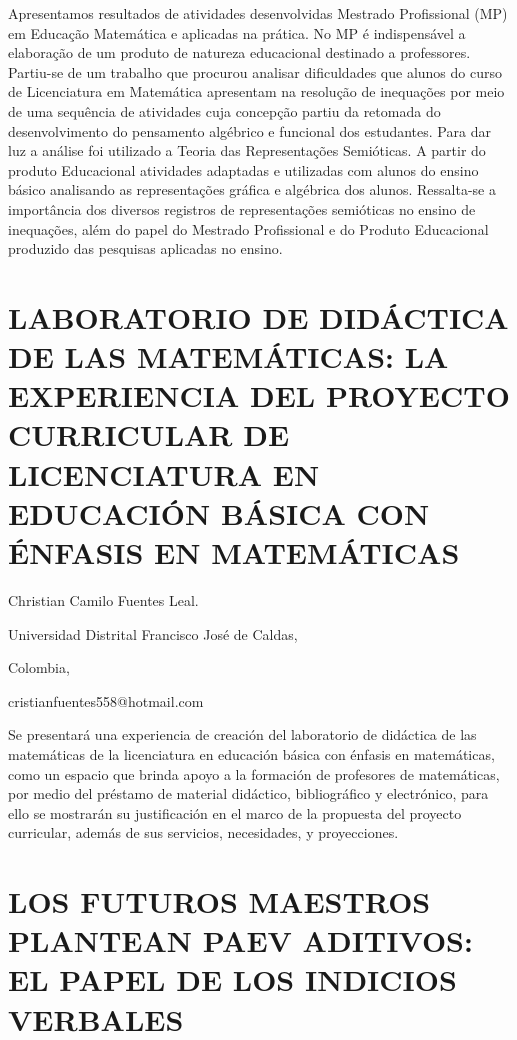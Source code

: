 Apresentamos resultados de atividades desenvolvidas Mestrado Profissional
(MP) em Educação Matemática e aplicadas na prática. No MP é indispensável
a elaboração de um produto de natureza educacional destinado a professores.
Partiu-se de um trabalho que procurou analisar dificuldades que alunos
do curso de Licenciatura em Matemática apresentam na resolução de
inequações por meio de uma sequência de atividades cuja concepção
partiu da retomada do desenvolvimento do pensamento algébrico e funcional
dos estudantes. Para dar luz a análise foi utilizado a Teoria das
Representações Semióticas. A partir do produto Educacional atividades
adaptadas e utilizadas com alunos do ensino básico analisando as representações
gráfica e algébrica dos alunos. Ressalta-se a importância dos diversos
registros de representações semióticas no ensino de inequações, além
do papel do Mestrado Profissional e do Produto Educacional produzido
das pesquisas aplicadas no ensino.


\section{LABORATORIO DE DIDÁCTICA DE LAS MATEMÁTICAS: LA EXPERIENCIA DEL PROYECTO
CURRICULAR DE LICENCIATURA EN EDUCACIÓN BÁSICA CON ÉNFASIS EN MATEMÁTICAS}

\begin{datos}

Christian Camilo Fuentes Leal.

Universidad Distrital Francisco José de Caldas,

Colombia,

cristianfuentes558@hotmail.com 

\end{datos}

Se presentará una experiencia de creación del laboratorio de didáctica
de las matemáticas de la licenciatura en educación básica con énfasis
en matemáticas, como un espacio que brinda apoyo a la formación de
profesores de matemáticas, por medio del préstamo de material didáctico,
bibliográfico y electrónico, para ello se mostrarán su justificación
en el marco de la propuesta del proyecto curricular, además de sus
servicios, necesidades, y proyecciones. 


\section{LOS FUTUROS MAESTROS PLANTEAN PAEV ADITIVOS: EL PAPEL DE LOS INDICIOS
VERBALES}

